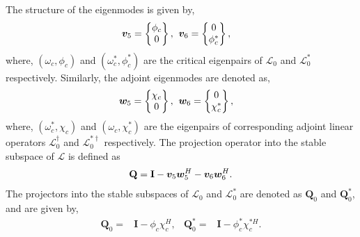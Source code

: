The structure of the eigenmodes is given by,
 \begin{align}
	\boldsymbol{v}_{5} = \begin{Bmatrix}
		\phi_{c} \\
		0 
	\end{Bmatrix}, & \hspace{2mm}
	\boldsymbol{v}_{6} = \begin{Bmatrix}
		0 \\
		\phi^{*}_{c} 
	\end{Bmatrix}, \nonumber
\end{align}
where, $(\omega_{c},\phi_{c})$ and $(\omega^{*}_{c},\phi^{*}_{c})$ are the critical eigenpairs of $\mathcal{L}_{0}$ and $\mathcal{L}^{*}_{0}$ respectively. Similarly, the adjoint eigenmodes are denoted as,
\begin{align}
	\boldsymbol{w}_{5} = \begin{Bmatrix}
		\chi_{c} \\
		0 
	\end{Bmatrix}, & \hspace{2mm}
	\boldsymbol{w}_{6} = \begin{Bmatrix}
		0 \\
		\chi^{*}_{c} 
	\end{Bmatrix}, \nonumber
\end{align}
where, $(\omega^{*}_{c},\chi_{c})$ and $(\omega_{c},\chi^{*}_{c})$ are the eigenpairs of corresponding adjoint linear operators $\mathcal{L}^{\dagger}_{0}$ and $\mathcal{L}^{*\dagger}_{0}$ respectively. The projection operator into the stable subspace of $\mathcal{L}$ is defined as
\begin{align}
	\mathbf{Q} = \mathbf{I} - \boldsymbol{v}_{5}\boldsymbol{w}_{5}^{H} - \boldsymbol{v}_{6}\boldsymbol{w}_{6}^{H}. \nonumber
\end{align}
The projectors into the stable subspaces of $\mathcal{L}_{0}$ and $\mathcal{L}^{*}_{0}$ are denoted as $\mathbf{Q}_{0}$ and $\mathbf{Q}^{*}_{0}$, and are given by,
\begin{align}
	\mathbf{Q}_{0} 			=& \mathbf{I} - \phi_{c}\chi^{H}_{c}, & 
	\mathbf{Q}^{*}_{0} 	=& \mathbf{I} - \phi^{*}_{c}\chi^{*H}_{c}. \nonumber
\end{align}

